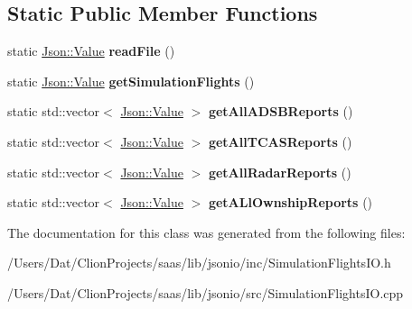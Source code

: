 \subsection*{Static Public Member Functions}
\begin{DoxyCompactItemize}
\item 
static \hyperlink{class_json_1_1_value}{Json\+::\+Value} {\bfseries read\+File} ()\hypertarget{class_simulation_flights_i_o_a94216ff482f30e981ecdcfe6b60b32e1}{}\label{class_simulation_flights_i_o_a94216ff482f30e981ecdcfe6b60b32e1}

\item 
static \hyperlink{class_json_1_1_value}{Json\+::\+Value} {\bfseries get\+Simulation\+Flights} ()\hypertarget{class_simulation_flights_i_o_a6f7ccb43c03b884d2f2e9626388eafb3}{}\label{class_simulation_flights_i_o_a6f7ccb43c03b884d2f2e9626388eafb3}

\item 
static std\+::vector$<$ \hyperlink{class_json_1_1_value}{Json\+::\+Value} $>$ {\bfseries get\+All\+A\+D\+S\+B\+Reports} ()\hypertarget{class_simulation_flights_i_o_a547b6678fe198a55d6a6b4ff9b41219a}{}\label{class_simulation_flights_i_o_a547b6678fe198a55d6a6b4ff9b41219a}

\item 
static std\+::vector$<$ \hyperlink{class_json_1_1_value}{Json\+::\+Value} $>$ {\bfseries get\+All\+T\+C\+A\+S\+Reports} ()\hypertarget{class_simulation_flights_i_o_a7bcaa781177cdd7af4b20cd2bc30a205}{}\label{class_simulation_flights_i_o_a7bcaa781177cdd7af4b20cd2bc30a205}

\item 
static std\+::vector$<$ \hyperlink{class_json_1_1_value}{Json\+::\+Value} $>$ {\bfseries get\+All\+Radar\+Reports} ()\hypertarget{class_simulation_flights_i_o_a3d0eced277e173d340808665c2e0edfa}{}\label{class_simulation_flights_i_o_a3d0eced277e173d340808665c2e0edfa}

\item 
static std\+::vector$<$ \hyperlink{class_json_1_1_value}{Json\+::\+Value} $>$ {\bfseries get\+A\+Ll\+Ownship\+Reports} ()\hypertarget{class_simulation_flights_i_o_a60542714b7bf8d2f8ce4cb335350f05d}{}\label{class_simulation_flights_i_o_a60542714b7bf8d2f8ce4cb335350f05d}

\end{DoxyCompactItemize}


The documentation for this class was generated from the following files\+:\begin{DoxyCompactItemize}
\item 
/\+Users/\+Dat/\+Clion\+Projects/saas/lib/jsonio/inc/Simulation\+Flights\+I\+O.\+h\item 
/\+Users/\+Dat/\+Clion\+Projects/saas/lib/jsonio/src/Simulation\+Flights\+I\+O.\+cpp\end{DoxyCompactItemize}
